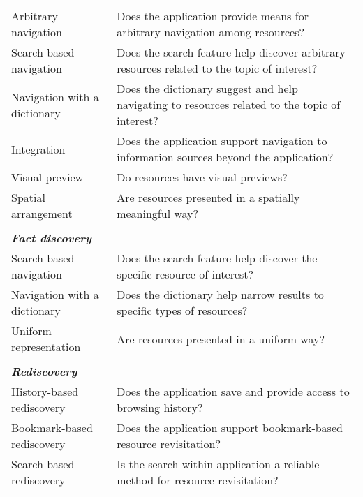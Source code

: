 \documentclass{casconpaper}
\begin{document}
{\begin{table*}[htbp]
\begin{tabular}{|p{0.30\linewidth}|p{0.70\linewidth}|}
Arbitrary navigation         & Does the application provide means for arbitrary navigation among resources?                              \\
Search-based navigation      & Does the search feature help discover arbitrary resources related to the topic of interest?               \\
Navigation with a dictionary & Does the dictionary suggest and help navigating to resources related to the topic of interest?           \\
Integration                  & Does the application support navigation to information sources beyond the application?                   \\
Visual preview               & Do resources have visual previews?                                                                        \\
Spatial arrangement          & Are resources presented in a spatially meaningful way?                                                    \\
&\\
\emph{\textbf{Fact discovery}}                &                                                                                                           \\
Search-based navigation      & Does the search feature help discover the specific resource of interest?                                  \\
Navigation with a dictionary & Does the dictionary help narrow results to specific types of resources?                                   \\
Uniform representation       & Are resources presented in a uniform way?                                                                 \\
&\\
\emph{\textbf{Rediscovery}}                     &                                                                                                           \\
History-based rediscovery    & Does the application save and provide access to browsing history?                                        \\
Bookmark-based rediscovery   & Does the application support bookmark-based resource revisitation?                                        \\
Search-based rediscovery     & Is the search within application a reliable method for resource revisitation?                             \\

\end{tabular}
\end{table*}}
\end{document}
